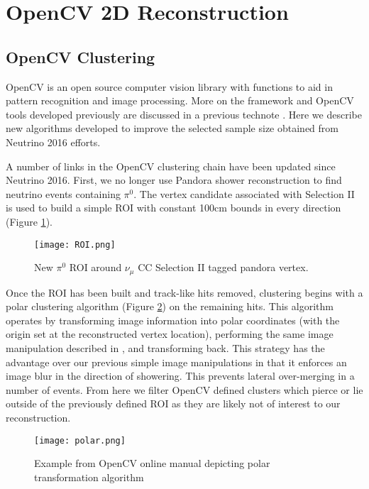 \documentclass[a4paper]{article}
\begin{document}
\section{OpenCV 2D Reconstruction}
\subsection{OpenCV Clustering}
OpenCV is an open source computer vision library with functions to aid in pattern recognition and image processing. More on the framework and OpenCV tools developed previously are discussed in a previous technote \cite{bib:5856}. Here we describe new algorithms developed to improve the selected sample size obtained from Neutrino 2016 efforts\cite{bib:5864}.
\par A number of links in the OpenCV clustering chain have been updated since Neutrino 2016. First, we no longer use Pandora shower reconstruction to find neutrino events containing $\pi^0$. The vertex candidate associated with Selection II is used to build a simple ROI with constant 100cm bounds in every direction (Figure \ref{fig:roi}). 

\begin{figure}[h!]
\centering
\texttt{[image: ROI.png]}
\caption{New $\pi^0$ ROI around $\nu_\mu$ CC Selection II tagged pandora vertex. }
\label{fig:roi}
\end{figure}

\par Once the ROI has been built and track-like hits removed, clustering begins with a polar clustering algorithm (Figure \ref{fig:polar}) on the remaining hits. This algorithm operates by transforming image information into polar coordinates (with the origin set at the reconstructed vertex location), performing the same image manipulation described in \cite{bib:5856}, and transforming back. This strategy has the advantage over our previous simple image manipulations in that it enforces an image blur in the direction of showering. This prevents lateral over-merging in a number of events. From here we filter OpenCV defined clusters which pierce or lie outside of the previously defined ROI as they are likely not of interest to our reconstruction. 

\begin{figure}[h!]
\centering
\texttt{[image: polar.png]}
\caption{ Example from OpenCV online manual depicting polar transformation algorithm }
\label{fig:polar}
\end{figure}
\end{document}
